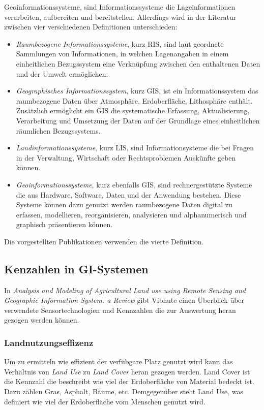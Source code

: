 Geoinformationssysteme, sind Informationssysteme die Lageinformationen verarbeiten, aufbereiten und bereitstellen. Allerdings wird in der Literatur zwischen vier verschiedenen Definitionen unterschieden:\cite{book:Carosio2006}

\begin{itemize}
	\item \textit{Raumbezogene Informationssysteme}, kurz RIS, sind laut \cite{book:Cariosio2006} geordnete Sammlungen von Informationen, in welchen Lagenangaben in einem einheitlichen Bezugssystem eine Verknüpfung zwischen den enthaltenen Daten und der Umwelt ermöglichen.
	\item \textit{Geographisches Informationssystem}, kurz GIS, ist ein Informationssystem das raumbezogene Daten über Atmosphäre, Erdoberfläche, Lithosphäre enthält. Zusätzlich ermöglicht ein GIS die systematische Erfassung, Aktualisierung, Verarbeitung und Umsetzung der Daten auf der Grundlage eines einheitlichen räumlichen Bezugssystems.
	\item \textit{Landinformationssysteme}, kurz LIS, sind Informationsysteme die bei Fragen in der Verwaltung, Wirtschaft oder Rechtsproblemen Auskünfte geben können. 
	\item \textit{Geoinformationssysteme}, kurz ebenfalls GIS, sind rechnergestützte Systeme die aus Hardware, Software, Daten und der Anwendung bestehen. Diese Systeme können dazu genutzt werden raumbezogene Daten digital zu erfassen, modellieren, reorganisieren, analysieren und alphanumerisch und graphisch präsentieren können.
\end{itemize}

Die vorgestellten Publikationen verwenden die vierte Definition.

\subsection{Kenzahlen in GI-Systemen}
In \textit{Analysis and Modeling of Agricultural Land use using Remote Sensing and Geographic Information System: a Review} gibt Vibhute einen Überblick über verwendete Sensortechnologien und Kennzahlen die zur Auswertung heran gezogen werden können.  \cite{jour:Vibhute2013}

\subsubsection{Landnutzungseffizenz}

Um zu ermitteln wie effizient der verfübgare Platz genutzt wird kann das Verhältnis von \textit{Land Use} zu \textit{Land Cover} heran gezogen werden. Land Cover ist die Kennzahl die beschreibt wie viel der Erdoberfläche von Material bedeckt ist. Dazu zählen Gras, Asphalt, Bäume, etc. Demgegenüber steht Land Use, was definiert wie viel der Erdoberfläche vom Menschen genutzt wird.

